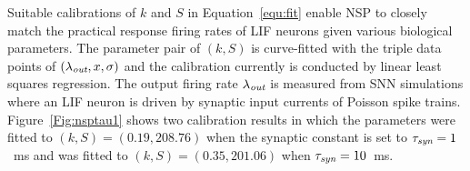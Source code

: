 	
	Suitable calibrations of $k$ and $S$ in Equation~\ref{equ:fit} enable NSP to closely match the practical response firing rates of LIF neurons given various biological parameters.
	The parameter pair of $(k, S)$ is curve-fitted with the triple data points of $(\lambda_{\textit{\textrm{out}}}, x, \sigma)$ and the calibration currently is conducted by linear least squares regression.
	The output firing rate $\lambda_{\textit{\textrm{out}}}$ is measured from SNN simulations where an LIF neuron is driven by synaptic input currents of Poisson spike trains.
	Figure~\ref{Fig:nsptau1} shows two calibration results in which the parameters were fitted to $(k, S)=(0.19,208.76)$ when the synaptic constant is set to $\tau_{\textit{\textrm{syn}}}=1$~ms and was fitted to $(k, S)=(0.35,201.06)$ when $\tau_{\textit{\textrm{syn}}}=10$~ms.

